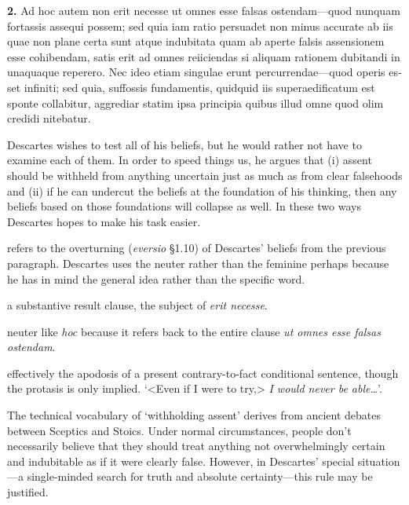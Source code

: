 
\clearpage

\beginnumbering
\pstart
\begin{latin}
    \textenglish{\textbf{2.}} Ad hoc autem non erit necesse ut omnes esse falsas ostendam---quod nunquam fortassis assequi possem; sed quia iam ratio persuadet non minus accurate ab iis quae non plane certa sunt atque indubitata quam ab aperte falsis assensionem esse cohibendam, satis erit ad omnes reiiciendas si aliquam rationem dubitandi in unaquaque reperero. Nec ideo etiam singulae erunt percurrendae---quod operis esset infiniti; sed quia, suffossis fundamentis, quidquid iis superaedificatum est sponte collabitur, aggrediar statim ipsa principia quibus illud omne quod olim credidi nitebatur.
\end{latin}
\pend
\endnumbering

\prenotes

Descartes wishes to test all of his beliefs, but he would rather not have to examine each of them. In order to speed things us, he argues that (i) assent should be withheld from anything uncertain just as much as from clear falsehoods and (ii) if he can undercut the beliefs at the foundation of his thinking, then any beliefs based on those foundations will collapse as well. In these two ways Descartes hopes to make his task easier.

 refers to the overturning (\textit{eversio} §1.10) of Descartes' beliefs from the previous paragraph. Descartes uses the neuter rather than the feminine perhaps because he has in mind the general idea rather than the specific word.

 a substantive result clause, the subject of \textit{erit necesse}.

 neuter like \textit{hoc} because it refers back to the entire clause \textit{ut omnes esse falsas ostendam}.

 effectively the apodosis of a present contrary-to-fact conditional sentence, though the protasis is only implied. `<Even if I were to try,> \textit{I would never be able\dots}'.

 The technical vocabulary of `withholding assent' derives from ancient debates between Sceptics and Stoics. Under normal circumstances, people don't necessarily believe that they should treat anything not overwhelmingly certain and indubitable as if it were clearly false. However, in Descartes' special situation---a single-minded search for truth and absolute certainty---this rule may be justified.

